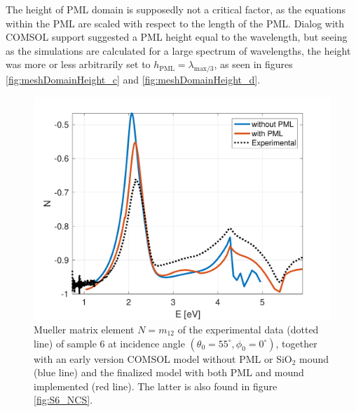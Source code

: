 The height of PML domain is supposedly not a critical factor, as the equations within the PML are scaled with respect to the length of the PML. Dialog with COMSOL support suggested a PML height equal to the wavelength, but seeing as the simulations are calculated for a large spectrum of wavelengths, the height was more or less arbitrarily set to $h_{\text{PML}}=\lambda_{\text{max}/3}$, as seen in figures \ref{fig:meshDomainHeight_c} and \ref{fig:meshDomainHeight_d}.

\begin{figure}
    \centering
    \includegraphics[width=0.5\linewidth]{figures/ch4/implem/m12_PMLcomparison.pdf}
    \caption{Mueller matrix element $N=m_{12}$ of the experimental data (dotted line) of sample 6 at incidence angle $(\theta_0=55^\circ, \phi_0=0^\circ)$, together with an early version COMSOL model without PML or SiO$_2$ mound (blue line) and the finalized model with both PML and mound implemented (red line). The latter is also found in figure \ref{fig:S6_NCS}.} 
    \label{fig:noPML_vs_PML_S6}
\end{figure}

